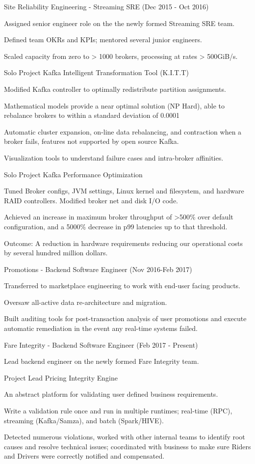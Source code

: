 \documentclass[10pt,letterpaper]{article}
\begin{document}
{\item Site Reliability Engineering - Streaming SRE (Dec 2015 - Oct 2016)
  \item Assigned senior engineer role on the the newly formed Streaming SRE team. 
  \item Defined team OKRs and KPIs; mentored several junior engineers.
  \item Scaled capacity from zero to > 1000 brokers, processing at rates > 500GiB/s.
  \item [Solo Project] Kafka Intelligent Transformation Tool (K.I.T.T) 
    \item Modified Kafka controller to optimally redistribute partition assignments.
    \item Mathematical models provide a near optimal solution (NP Hard), able to rebalance brokers to within a standard deviation of 0.0001%
    \item Automatic cluster expansion, on-line data rebalancing, and contraction when a broker fails, features not supported by open source Kafka.
    \item Visualization tools to understand failure cases and intra-broker affinities.
  \item [Solo Project] Kafka Performance Optimization
    \item Tuned Broker configs, JVM settings, Linux kernel and filesystem, and hardware RAID controllers. Modified broker net and disk I/O code.
    \item Achieved an increase in maximum broker throughput of >500\% over default configuration, and a 5000\% decrease in p99 latencies up to that threshold.
    \item Outcome: A reduction in hardware requirements reducing our operational costs by several hundred million dollars.
    \item Promotions - Backend Software Engineer (Nov 2016-Feb 2017)
    \item Transferred to marketplace engineering to work with end-user facing products. 
    \item Oversaw all-active data re-architecture and migration.
    \item Built auditing tools for post-transaction analysis of user promotions and execute automatic remediation in the event any real-time systems failed.
    \item Fare Integrity - Backend Software Engineer (Feb 2017 - Present)
    \item Lead backend engineer on the newly formed Fare Integrity team.
  \item [Project Lead] Pricing Integrity Engine
    \item An abstract platform for validating user defined business requirements.
    \item Write a validation rule once and run in multiple runtimes; real-time (RPC), streaming (Kafka/Samza), and batch (Spark/HIVE).
    \item Detected numerous violations, worked with other internal teams to identify root causes and resolve technical issues; coordinated with business to make sure Riders and Drivers were correctly notified and compensated.
}
\end{document}
